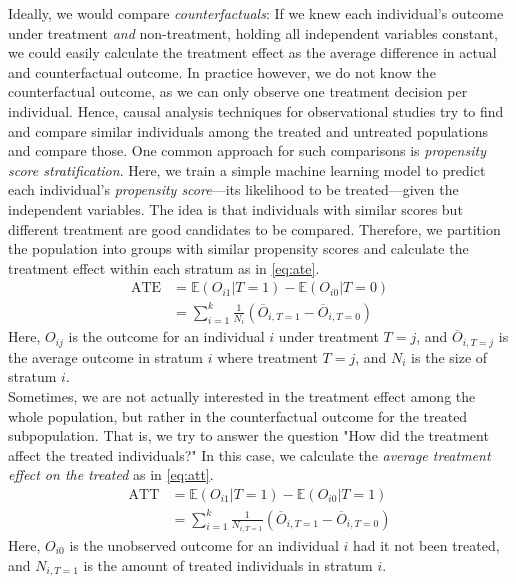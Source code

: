 \documentclass[acmsmall, nonacm, screen]{acmart} %
\begin{document}
Ideally, we would compare \textit{counterfactuals}: If we knew each individual's outcome under treatment \textit{and} non-treatment, holding all independent variables constant, we could easily calculate the treatment effect as the average difference in actual and counterfactual outcome.
In practice however, we do not know the counterfactual outcome, as we can only observe one treatment decision per individual.
Hence, causal analysis techniques for observational studies try to find and compare similar individuals among the treated and untreated populations and compare those.
One common approach for such comparisons is \textit{propensity score stratification}. Here, we train a simple machine learning model to predict each individual's \textit{propensity score}---its likelihood to be treated---given the independent variables.
The idea is that individuals with similar scores but different treatment are good candidates to be compared. 
Therefore, we partition the population into groups with similar propensity scores and calculate the treatment effect within each stratum as in \autoref{eq:ate}.
\begin{equation}
\label{eq:ate}
\begin{aligned}
\text{ATE} &= \mathbb{E}(O_{i1} | T=1) - \mathbb{E}(O_{i0} | T=0)\\
 &= \sum_{i=1}^{k}{\frac{1}{N_i}(\overline{O}_{i, T = 1} - \overline{O}_{i, T = 0})}
\end{aligned}
\end{equation}
Here, $O_{ij}$ is the outcome for an individual $i$ under treatment $T=j$, and $\overline{O}_{i, T = j}$ is the average outcome in stratum $i$ where treatment $T = j$, and $N_i$ is the size of stratum $i$.\\

Sometimes, we are not actually interested in the treatment effect among the whole population, but rather in the counterfactual outcome for the treated subpopulation. That is, we try to answer the question "How did the treatment affect the treated individuals?" In this case, we calculate the \textit{average treatment effect on the treated} as in \autoref{eq:att}.
\begin{equation}
\label{eq:att}
\begin{aligned}
\text{ATT} &= \mathbb{E}(O_{i1} | T=1) - \mathbb{E}(O_{i0} | T=1)\\
 &= \sum_{i=1}^{k}{\frac{1}{N_{i, T = 1}}(\overline{O}_{i,T = 1} - \overline{O}_{i,T = 0})}
\end{aligned}
\end{equation}
Here, $O_{i0}$ is the unobserved outcome for an individual $i$ had it not been treated, and $N_{i, T = 1}$ is the amount of treated individuals in stratum $i$.\\
\end{document}
